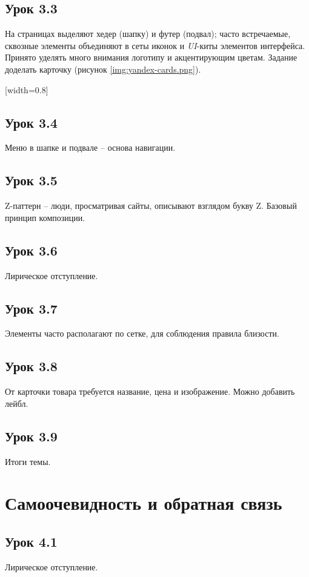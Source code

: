 \documentclass[variant=practice]{bsuir}
\begin{document}
\subsection{Урок 3.3} На страницах выделяют хедер (шапку) и футер (подвал);
часто встречаемые, сквозные элементы объединяют в сеты иконок и \textit{UI}-киты
элементов интерфейса. Принято уделять много внимания логотипу и акцентирующим
цветам. Задание доделать карточку (рисунок \ref{img:yandex-cards.png}).

[width=0.8\textwidth]

\subsection{Урок 3.4} Меню в шапке и подвале -- основа навигации.

\subsection{Урок 3.5} Z-паттерн -- люди, просматривая сайты, описывают взглядом
букву Z. Базовый принцип композиции.

\subsection{Урок 3.6} Лирическое отступление.

\subsection{Урок 3.7} Элементы часто располагают по сетке, для соблюдения
правила близости.

\subsection{Урок 3.8} От карточки товара требуется название, цена и изображение.
Можно добавить лейбл.

\subsection{Урок 3.9} Итоги темы.

\section{Самоочевидность и обратная связь}

\subsection{Урок 4.1} Лирическое отступление.
\end{document}
